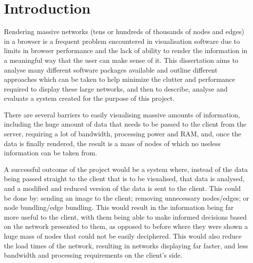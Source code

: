 \documentclass[../dissertation.tex]{subfiles}
\begin{document}
\chapter{Introduction}

Rendering massive networks (tens or hundreds of thousands of nodes and edges) in a browser is a frequent problem encountered in visualisation software due to limits in browser performance and the lack of ability to render the information in a meaningful way that the user can make sense of it. This dissertation aims to analyse many different software packages available and outline different approaches which can be taken to help minimize the clutter and performance required to display these large networks, and then to describe, analyse and evaluate a system created for the purpose of this project.

There are several barriers to easily visualising massive amounts of information, including the huge amount of data that needs to be passed to the client from the server, requiring a lot of bandwidth, processing power and RAM, and, once the data is finally rendered, the result is a mass of nodes of which no useless information can be taken from. 

A successful outcome of the project would be a system where, instead of the data being passed straight to the client that is to be visualised, that data is analysed, and a modified and reduced version of the data is sent to the client. This could be done by: sending an image to the client; removing unnecessary nodes/edges; or node bundling/edge bundling. This would result in the information being far more useful to the client, with them being able to make informed decisions based on the network presented to them, as opposed to before where they were shown a huge mass of nodes that could not be easily deciphered. This would also reduce the load times of the network, resulting in networks displaying far faster, and less bandwidth and processing requirements on the client's side.
\end{document}
